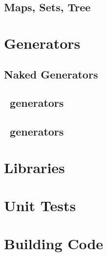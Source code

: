 \subsection{Maps, Sets, Tree}

\section{Generators}

\subsection{Naked Generators}

\subsection{\say~generators}

\subsection{\ask~generators}

\section{Libraries}

\section{Unit Tests}

\section{Building Code}
